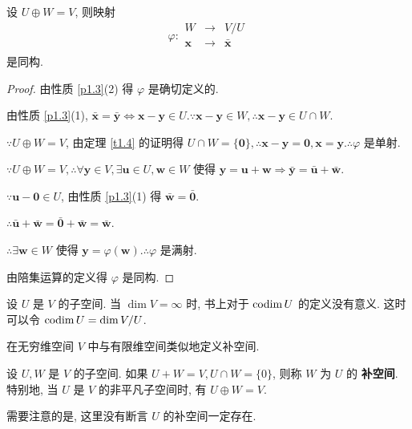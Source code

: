 \documentclass[color=black,device=normal,lang=cn,mode=geye]{elegantnote}
\begin{document}
\begin{theorem}[书上的定理 10]
    设 $U\oplus W=V$, 则映射
    \[\varphi:\begin{array}{rcl}
        W & \to & V/U \\
        \boldsymbol{x} & \to & \bar{\boldsymbol{x}} \\
    \end{array}\]
    是同构.
\end{theorem}
\begin{proof}
    由性质 \ref{p1.3}(2) 得 $\varphi$ 是确切定义的.
    
    由性质 \ref{p1.3}(1), $\bar{\boldsymbol{x}}=\bar{\boldsymbol{y}}\Leftrightarrow\boldsymbol{x}-\boldsymbol{y}\in U.\because\boldsymbol{x}-\boldsymbol{y}\in W,\therefore\boldsymbol{x}-\boldsymbol{y}\in U\cap W$.

    $\because U\oplus W=V$, 由定理 \ref{t1.4} 的证明得 $U\cap W=\{\boldsymbol{0}\},\therefore\boldsymbol{x}-\boldsymbol{y}=\boldsymbol{0},\boldsymbol{x}=\boldsymbol{y}.\therefore\varphi$ 是单射.

    $\because U\oplus W=V,\therefore\forall\boldsymbol{y}\in V,\exists\boldsymbol{u}\in U,\boldsymbol{w}\in W$ 使得 $\boldsymbol{y}=\boldsymbol{u}+\boldsymbol{w}\Rightarrow\bar{\boldsymbol{y}}=\bar{\boldsymbol{u}}+\bar{\boldsymbol{w}}$.

    $\because\boldsymbol{u}-\boldsymbol{0}\in U$, 由性质 \ref{p1.3}(1) 得 $\bar{\boldsymbol{w}}=\bar{\boldsymbol{0}}$.

    $\therefore\bar{\boldsymbol{u}}+\bar{\boldsymbol{w}}=\bar{\boldsymbol{0}}+\bar{\boldsymbol{w}}=\bar{\boldsymbol{w}}$.
    
    $\therefore\exists\boldsymbol{w}\in W$ 使得 $\boldsymbol{y}=\varphi(\boldsymbol{w}).\therefore\varphi$ 是满射.
    
    由陪集运算的定义得 $\varphi$ 是同构.
\end{proof}

设 $U$ 是 $V$ 的子空间. 当 $\dim V=\infty$ 时, 书上对于 $\operatorname{codim} U$ 的定义没有意义. 这时可以令 $\operatorname{codim} U=\dim V/U$.

在无穷维空间 $V$ 中与有限维空间类似地定义补空间.
\begin{definition}
    设 $U,W$ 是 $V$ 的子空间. 如果 $U+W=V,U\cap W=\{0\}$, 则称 $W$ 为 $U$ 的 \textbf{补空间}. 特别地, 当 $U$ 是 $V$ 的非平凡子空间时, 有 $U\oplus W=V$.
\end{definition}

需要注意的是, 这里没有断言 $U$ 的补空间一定存在.
\end{document}
